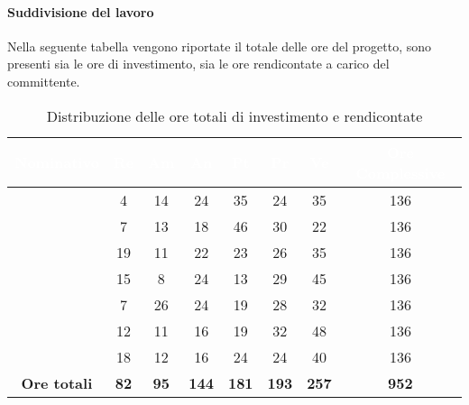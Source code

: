 \paragraph{Suddivisione del lavoro}
Nella seguente tabella vengono riportate il totale delle ore del progetto, sono presenti sia le ore di investimento, sia le ore rendicontate a carico del committente.
\begin{table}[H]
	\begin{center}
		\begin{tabular}{ |c c c c c c c c| }
		\rowcolor{darkblue} 
		\textcolor{white}{\textbf{Nominativo}} & \textcolor{white}{\textbf{Re}} & \textcolor{white}{\textbf{Am}} & \textcolor{white}{\textbf{An}} & \textcolor{white}{\textbf{Pt}} & \textcolor{white}{\textbf{Pr}} & \textcolor{white}{\textbf{Ve}} & \textcolor{white}{\textbf{Ore Complessive}} \\ \hline
		\BL 	& 4  	& 14  	& 24 	& 35 	& 24 	& 35 	& 136 \\ \hline
		\FF 	& 7 	& 13 	& 18 	& 46 	& 30 	& 22 	& 136 \\ \hline
		\MM 	& 19  	& 11  	& 22 	& 23 	& 26 	& 35  	& 136 \\ \hline
		\PC 	& 15 	& 8  	& 24 	& 13 	& 29	& 45 	& 136 \\ \hline
		\TG 	& 7  	& 26 	& 24 	& 19 	& 28 	& 32 	& 136 \\ \hline
		\TL 	& 12  	& 11 	& 16 	& 19 	& 32 	& 48 	& 136 \\ \hline
		\VD 	& 18  	& 12  	& 16 	& 24 	& 24 	& 40 	& 136 \\ \hline
		\textbf{Ore totali} & \textbf{82} & \textbf{95} & \textbf{144} & \textbf{181} & \textbf{193} & \textbf{257} & \textbf{952} \\ \hline
		\end{tabular}
	\caption{Distribuzione delle ore totali di investimento e rendicontate}
	\end{center}
\end{table}
